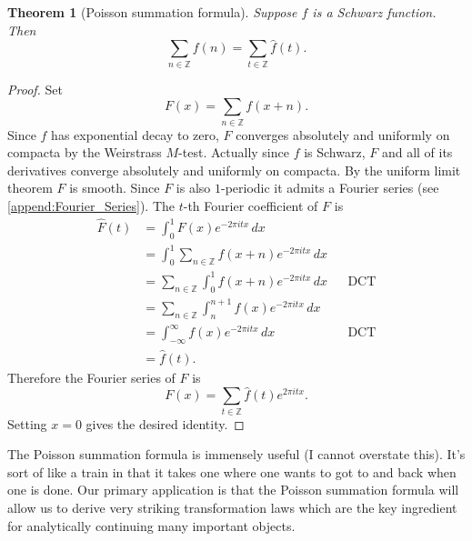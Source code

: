 \documentclass[12pt]{book}
\newtheorem{theorem}{Theorem}[section]
\theoremstyle{definition}\newframedtheorem{method}{Method}
\newcommand{\Z}{\mathbb{Z}}
\newcommand{\<}{\langle}
\renewcommand{\>}{\rangle}
\begin{document}
      \begin{theorem}[Poisson summation formula]
        Suppose $f$ is a Schwarz function. Then
        \[
          \sum_{n \in \Z}f(n) = \sum_{t \in \Z}\hat{f}(t).
        \]
      \end{theorem}
      \begin{proof}
        Set
        \[
          F(x) = \sum_{n \in \Z}f(x+n).
        \]
        Since $f$ has exponential decay to zero, $F$ converges absolutely and uniformly on compacta by the Weirstrass $M$-test. Actually since $f$ is Schwarz, $F$ and all of its derivatives converge absolutely and uniformly on compacta. By the uniform limit theorem $F$ is smooth. Since $F$ is also $1$-periodic it admits a Fourier series (see \cref{append:Fourier_Series}). The $t$-th Fourier coefficient of $F$ is
        \begin{align*}
          \hat{F}(t) &= \int_{0}^{1}F(x)e^{-2\pi itx}\,dx \\
          &= \int_{0}^{1}\sum_{n \in \Z}f(x+n)e^{-2\pi itx}\,dx \\
          &= \sum_{n \in \Z}\int_{0}^{1}f(x+n)e^{-2\pi itx}\,dx && \text{DCT} \\
          &= \sum_{n \in \Z}\int_{n}^{n+1}f(x)e^{-2\pi itx}\,dx \\
          &= \int_{-\infty}^{\infty}f(x)e^{-2\pi itx}\,dx && \text{DCT} \\
          &= \hat{f}(t).
        \end{align*}
        Therefore the Fourier series of $F$ is
        \[
          F(x) = \sum_{t \in \Z}\hat{f}(t)e^{2\pi itx}.
        \]
        Setting $x = 0$ gives the desired identity.
      \end{proof}

      The Poisson summation formula is immensely useful (I cannot overstate this). It's sort of like a train in that it takes one where one wants to got to and back when one is done. Our primary application is that the Poisson summation formula will allow us to derive very striking transformation laws which are the key ingredient for analytically continuing many important objects.
\end{document}
